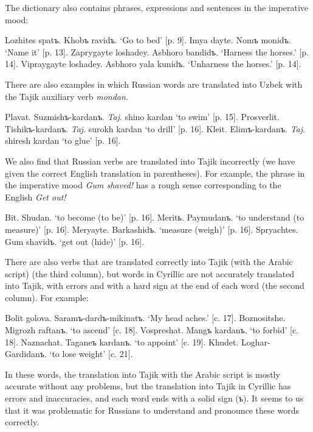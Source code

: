 \documentclass[output=paper,colorlinks,citecolor=brown,arabicfont,chinesefont]{langscibook}
\begin{document}
The dictionary also contains phrases, expressions and sentences in the imperative mood:

\ea 
    \ea Lozhites spatъ. 		Khobъ ravidъ.
        \glt `Go to bed'  	 [p. 9].
    \ex Imya dayte. 		Nomъ monidъ.
        \glt `Name it'  	 [p. 13].
    \ex Zaprygayte loshadey.    Asbhoro bandidъ.
        \glt `Harness the horses.'  [p. 14].
    \ex Vipraygayte loshadey.  Asbhoro yala kunidъ.
        \glt `Unharness the horses.'  [p. 14].
    \z
\z

There are also examples in which Russian words are translated into Uzbek with the Tajik auxiliary verb \textit{mondan}.

\ea
    \ea Plavat. 	Suzmishъ-kardanъ. 	\emph{Taj}. shino kardan
    \glt `to swim'  [p. 15].
    \ex Prosverlit.  Tishikъ-kardanъ. 		\emph{Taj}. surokh kardan
    \glt `to drill'  [p. 16].
    \ex Kleit. 	Elimъ-kardanъ. 		\emph{Taj}. shiresh kardan
    \glt `to glue'  [p. 16].
    \z
\z

We also find that Russian verbs  are translated into Tajik incorrectly (we have given the correct English translation in parentheses). For example, the phrase in the imperative mood \emph{Gum shaved!} has a rough sense corresponding to the English \emph{Get out!}

\ea
   \ea Bit. 		   Shudan.
       \glt `to become (to be)'  	[p. 16].
   \ex Meritь. 	   Paymudanъ.
       \glt `to understand 	(to measure)' 	[p. 16].
   \ex Meryayte. 	   Barkashidъ.
       \glt `measure (weigh)'   	[p. 16].
   \ex Spryachtes.   Gum shavidъ.
       \glt `get out (hide)'  [p. 16].
   \z
\z

There are also verbs that are translated correctly into  Tajik (with the Arabic script) (the third column), but words in Cyrillic are not accurately translated into  Tajik, with errors and with a hard sign at the end of each word (the second column). For example: 

\ea
    \ea Bolit golova.     Saramъ-dardъ-mikinatъ.
        \glt `My head aches.'   [c. 17].
    \ex Boznositshe.      Migrozh raftanъ.
        \glt `to ascend'                [c. 18].
    \ex Vospreshat.       Mangъ kardanъ.
        \glt `to forbid'                 [c. 18].
    \ex Naznachat.       Taganeъ kardanъ.
        \glt `to appoint'                 [c. 19].
    \ex Khudet.             Loghar-Gardidanъ.
        \glt `to lose weight'              [c. 21].
    \z
\z

In these  words, the translation into  Tajik with the Arabic script is mostly accurate without any problems, but the translation into  Tajik in Cyrillic has errors and inaccuracies, and each word ends with a solid sign (ъ). It seems to us that it was problematic for Russians to understand and pronounce these words correctly.
\end{document}
